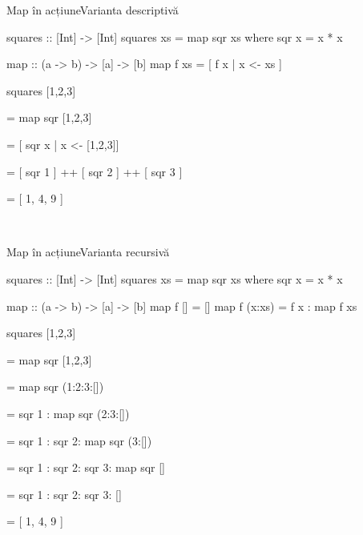 \documentclass[xcolor=pdftex,romanian,colorlinks]{beamer}
\begin{document}
\begin{frame}[fragile]{Map în acțiune}{Varianta descriptivă}
\begin{minipage}{.49\columnwidth}%
\begin{asciihs}
squares :: [Int] -> [Int]
squares xs = map sqr xs
  where sqr x = x * x
\end{asciihs}
\end{minipage}
\begin{minipage}{.49\columnwidth}
\begin{asciihs}
map :: (a -> b) -> [a] -> [b]
map f xs = [ f x | x <- xs ]
\end{asciihs}
\end{minipage}

\vfill
squares [1,2,3]

\medskip
= map sqr [1,2,3]

\medskip
{}
= [ sqr x | x <- [1,2,3]]

\medskip
{}
= [ sqr 1 ] ++ [ sqr 2 ] ++ [ sqr 3 ]

\medskip
= [ 1, 4, 9 ]

\vfill\
\end{frame}


\begin{frame}[fragile]{Map în acțiune}{Varianta recursivă}
\begin{minipage}{.49\columnwidth}%
\begin{asciihs}
squares :: [Int] -> [Int]
squares xs = map sqr xs
  where sqr x = x * x
\end{asciihs}
\end{minipage}
\begin{minipage}{.49\columnwidth}
\begin{asciihs}
map :: (a -> b) -> [a] -> [b]
map f []     = []
map f (x:xs) = f x : map f xs
\end{asciihs}
\end{minipage}

\vfill
squares [1,2,3]

\medskip
= map sqr [1,2,3]

\medskip
= map sqr (1:2:3:[])

\medskip
{}
= sqr 1 : map sqr (2:3:[])

\medskip
{}
= sqr 1 : sqr 2: map sqr (3:[])

\medskip
= sqr 1 : sqr 2: sqr 3: map sqr []

\medskip
= sqr 1 : sqr 2: sqr 3: []

\medskip
= [ 1, 4, 9 ]

\vfill\
\end{frame}
\end{document}
